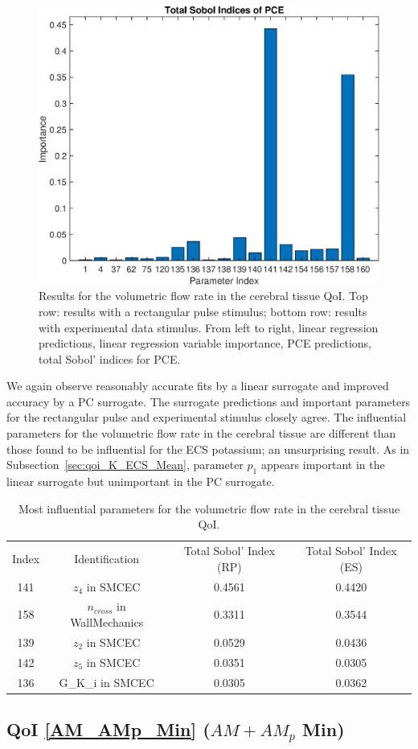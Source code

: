 \begin{figure}[h]
\includegraphics[width=.24 \textwidth]{Figures/Vol_Flow_QoI_PCE_SI_Experimental.eps}
\caption{Results for the volumetric flow rate in the cerebral tissue QoI. Top row: results with a rectangular pulse stimulus; bottom row: results with experimental data stimulus. From left to right, linear regression predictions, linear regression variable importance, PCE predictions, total Sobol' indices for PCE.}
\label{fig:qoi_vol_flow}
\end{figure}

We again observe reasonably accurate fits by a linear surrogate and improved accuracy by a PC surrogate. The surrogate predictions and important parameters for the rectangular pulse and experimental stimulus closely agree. The influential parameters for the volumetric flow rate in the cerebral tissue are different than those found to be influential for the ECS potassium; an unsurprising result. As in Subsection~\ref{sec:qoi_K_ECS_Mean}, parameter $p_1$ appears important in the linear surrogate but unimportant in the PC surrogate.

\begin{table}[h]
\centering
\begin{tabular}{cccc}
Index & Identification & Total Sobol' Index (RP) & Total Sobol' Index (ES)\\
141 &  $z_4$ in SMCEC & 0.4561 & 0.4420\\
158 & $n_{cross}$ in WallMechanics & 0.3311 & 0.3544\\ 
 139 & $z_2$ in SMCEC & 0.0529 & 0.0436\\
 142 & $z_5$ in SMCEC &  0.0351 &0.0305\\
  136 & G\_K\_i in SMCEC & 0.0305 &0.0362\\
\end{tabular}
\caption{Most influential parameters for the volumetric flow rate in the cerebral tissue QoI.}
\label{tab:qoi_vol_flow}
\end{table}

\subsection{QoI \eqref{AM_AMp_Min} ($AM+AM_p$ Min)}

